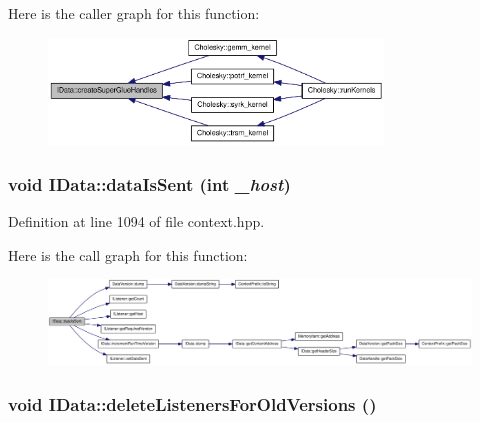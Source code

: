 Here is the caller graph for this function:\nopagebreak
\begin{figure}[H]
\begin{center}
\leavevmode
\includegraphics[width=252pt]{class_i_data_afbc48e6b22a12e8bcd7694c5613bf866_icgraph}
\end{center}
\end{figure}
\hypertarget{class_i_data_ac1422d1f14938dc89f4fabd7fdc90e9a}{
\subsubsection[{dataIsSent}]{\setlength{\rightskip}{0pt plus 5cm}void IData::dataIsSent (int {\em \_\-host})}}
\label{class_i_data_ac1422d1f14938dc89f4fabd7fdc90e9a}


Definition at line 1094 of file context.hpp.

Here is the call graph for this function:\nopagebreak
\begin{figure}[H]
\begin{center}
\leavevmode
\includegraphics[width=420pt]{class_i_data_ac1422d1f14938dc89f4fabd7fdc90e9a_cgraph}
\end{center}
\end{figure}
\hypertarget{class_i_data_a1abf008f5376563bffe458d81033efde}{
\subsubsection[{deleteListenersForOldVersions}]{\setlength{\rightskip}{0pt plus 5cm}void IData::deleteListenersForOldVersions ()}}
\label{class_i_data_a1abf008f5376563bffe458d81033efde}


